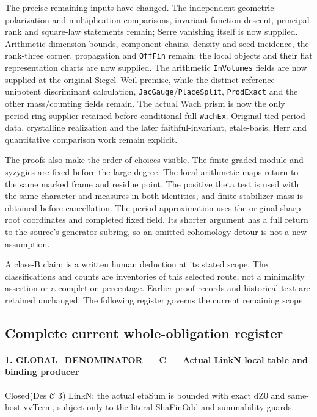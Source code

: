 \documentclass[11pt,a4paper]{article}
\numberwithin{equation}{section}
\theoremstyle{remark}\newtheorem{remark}[theorem]{Remark}
\begin{document}
The precise remaining inputs have changed. The independent geometric
polarization and multiplication comparisons, invariant-function
descent, principal rank and square-law statements remain; Serre
vanishing itself is now supplied. Arithmetic dimension bounds,
component chains, density and seed incidence, the rank-three corner,
propagation and \texttt{Off\allowbreak Fin} remain; the local objects and their
flat representation charts are now supplied. The arithmetic
\texttt{In\allowbreak Volumes} fields are now supplied at the original
Siegel--Weil premise, while the distinct reference unipotent
discriminant calculation, \texttt{Jac\allowbreak Gauge}/\texttt{Place\allowbreak Split},
\texttt{Prod\allowbreak Exact} and the other mass/counting fields remain.
The actual Wach prism is now the only period-ring supplier retained
before conditional full \texttt{Wach\allowbreak Ex}. Original tied period data,
crystalline realization and the later faithful-invariant, etale-basis,
Herr and quantitative comparison work remain explicit.

The proofs also make the order of choices visible. The finite graded
module and syzygies are fixed before the large degree. The local
arithmetic maps return to the same marked frame and residue point.
The positive theta test is used with the same character and measures
in both identities, and finite stabilizer mass is obtained before
cancellation. The period approximation uses the original sharp-root
coordinates and completed fixed field. Its shorter argument has a
full return to the source's generator subring, so an omitted
cohomology detour is not a new assumption.

A class-B claim is a written human deduction at its stated scope.
The classifications and counts are inventories of this selected route,
not a minimality assertion or a completion percentage. Earlier proof
records and historical text are retained unchanged. The following
register governs the current remaining scope.

\subsection{Complete current whole-obligation register}
\paragraph{1. GLOBAL\_\allowbreak DENOMINATOR — C — Actual LinkN local table and binding producer}

Closed(Des $\mathcal C$ 3) LinkN: the actual etaSum is bounded with exact dZ0 and same-host vvTerm, subject only to the literal ShaFinOdd and summability guards.
\end{document}
